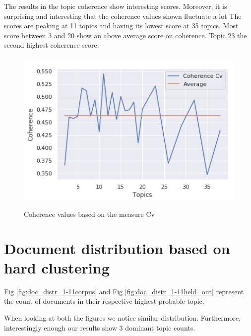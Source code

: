 The results in the topic coherence show interesting scores. Moreover, it is surprising and interesting that the coherence values shown fluctuate a lot The scores are peaking at 11 topics and having its lowest score at 35 topics. Most score between 3 and 20 show an above average score on coherence. Topic 23 the second highest coherence score. 

 \begin{figure}[h]
    \centering
    \includegraphics[width=15cm, height=8cm]{figures/coherence_values_topics.png}
    \caption{Coherence values based on the measure Cv}
    \label{fig:coherence}
\end{figure}

\FloatBarrier
\section{Document distribution based on hard clustering}\label{results:doc_distribution}
Fig \ref{fig:doc_distr_1-11corpus} and Fig \ref{fig:doc_distr_1-11held_out} represent the count of documents in their respective highest probable topic. 

When looking at both the figures we notice similar distribution. Furthermore, interestingly enough our results show 3 dominant topic counts. 

